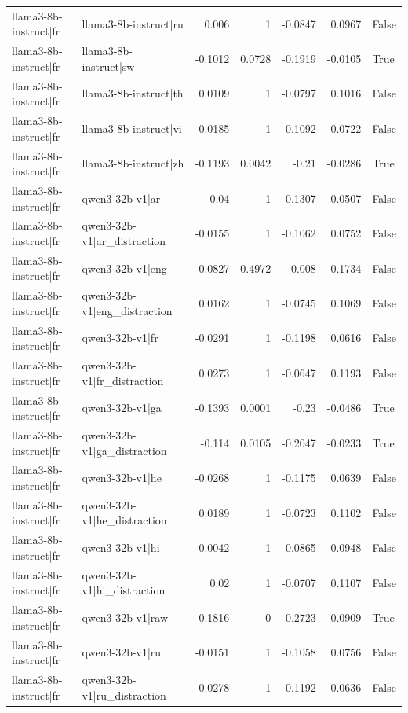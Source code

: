 \begin{table}
\begin{tabular}{l l r r r r l}
llama3-8b-instruct|fr & llama3-8b-instruct|ru & 0.006 & 1 & -0.0847 & 0.0967 & False \\
llama3-8b-instruct|fr & llama3-8b-instruct|sw & -0.1012 & 0.0728 & -0.1919 & -0.0105 & True \\
llama3-8b-instruct|fr & llama3-8b-instruct|th & 0.0109 & 1 & -0.0797 & 0.1016 & False \\
llama3-8b-instruct|fr & llama3-8b-instruct|vi & -0.0185 & 1 & -0.1092 & 0.0722 & False \\
llama3-8b-instruct|fr & llama3-8b-instruct|zh & -0.1193 & 0.0042 & -0.21 & -0.0286 & True \\
llama3-8b-instruct|fr & qwen3-32b-v1|ar & -0.04 & 1 & -0.1307 & 0.0507 & False \\
llama3-8b-instruct|fr & qwen3-32b-v1|ar_distraction & -0.0155 & 1 & -0.1062 & 0.0752 & False \\
llama3-8b-instruct|fr & qwen3-32b-v1|eng & 0.0827 & 0.4972 & -0.008 & 0.1734 & False \\
llama3-8b-instruct|fr & qwen3-32b-v1|eng_distraction & 0.0162 & 1 & -0.0745 & 0.1069 & False \\
llama3-8b-instruct|fr & qwen3-32b-v1|fr & -0.0291 & 1 & -0.1198 & 0.0616 & False \\
llama3-8b-instruct|fr & qwen3-32b-v1|fr_distraction & 0.0273 & 1 & -0.0647 & 0.1193 & False \\
llama3-8b-instruct|fr & qwen3-32b-v1|ga & -0.1393 & 0.0001 & -0.23 & -0.0486 & True \\
llama3-8b-instruct|fr & qwen3-32b-v1|ga_distraction & -0.114 & 0.0105 & -0.2047 & -0.0233 & True \\
llama3-8b-instruct|fr & qwen3-32b-v1|he & -0.0268 & 1 & -0.1175 & 0.0639 & False \\
llama3-8b-instruct|fr & qwen3-32b-v1|he_distraction & 0.0189 & 1 & -0.0723 & 0.1102 & False \\
llama3-8b-instruct|fr & qwen3-32b-v1|hi & 0.0042 & 1 & -0.0865 & 0.0948 & False \\
llama3-8b-instruct|fr & qwen3-32b-v1|hi_distraction & 0.02 & 1 & -0.0707 & 0.1107 & False \\
llama3-8b-instruct|fr & qwen3-32b-v1|raw & -0.1816 & 0 & -0.2723 & -0.0909 & True \\
llama3-8b-instruct|fr & qwen3-32b-v1|ru & -0.0151 & 1 & -0.1058 & 0.0756 & False \\
llama3-8b-instruct|fr & qwen3-32b-v1|ru_distraction & -0.0278 & 1 & -0.1192 & 0.0636 & False \\

\end{tabular}
\end{table}
